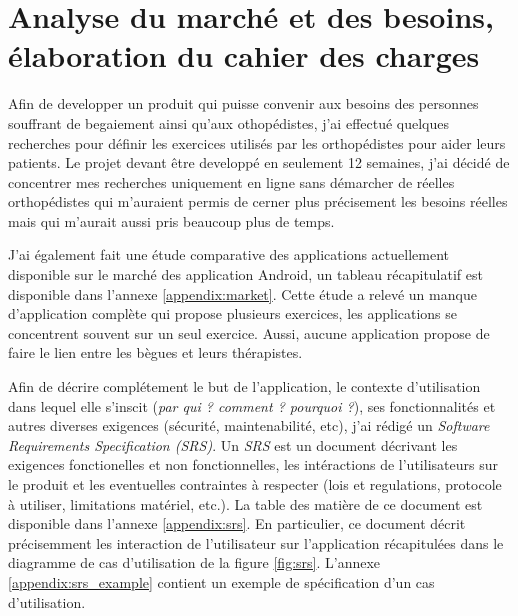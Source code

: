 \section{Analyse du marché et des besoins, élaboration du cahier des charges}
Afin de developper un produit qui puisse convenir aux besoins des personnes souffrant de begaiement ainsi qu'aux othopédistes, j'ai effectué quelques recherches pour définir les exercices utilisés par les orthopédistes pour aider leurs patients. Le projet devant être developpé en seulement 12 semaines, j'ai décidé de concentrer mes recherches uniquement en ligne sans démarcher de réelles orthopédistes qui m'auraient permis de cerner plus précisement les besoins réelles mais qui m'aurait aussi pris beaucoup plus de temps.

J'ai également fait une étude comparative des applications actuellement disponible sur le marché des application Android, un tableau récapitulatif est disponible dans l'annexe \ref{appendix:market}. Cette étude a relevé un manque d'application complète qui propose plusieurs exercices, les applications se concentrent souvent sur un seul exercice. Aussi, aucune application propose de faire le lien entre les bègues et leurs thérapistes.

Afin de décrire complétement le but de l'application, le contexte d'utilisation dans lequel elle s'inscit (\textit{par qui ? comment ? pourquoi ?}), ses fonctionnalités et autres diverses exigences (sécurité, maintenabilité, etc),  j'ai rédigé un \textit{Software Requirements Specification (SRS)}. Un \textit{SRS} est un document décrivant les exigences fonctionelles et non fonctionnelles, les intéractions de l'utilisateurs sur le produit et les eventuelles contraintes à respecter (lois et regulations, protocole à utiliser, limitations matériel, etc.). La table des matière de ce document est disponible dans l'annexe \ref{appendix:srs}. En particulier, ce document décrit précisemment les interaction de l'utilisateur sur l'application récapitulées dans le diagramme de cas d'utilisation de la figure \ref{fig:srs}. L'annexe \ref{appendix:srs_example} contient un exemple de spécification d'un cas d'utilisation.

